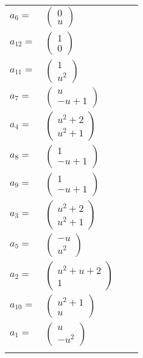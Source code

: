 \documentclass[1p]{elsarticle_modified}
\theoremstyle{definition}
\begin{document}
\begin{tabular}{m{7pt} m{180pt} m{7pt} m{180pt} }
\flushright $a_{6}=$&$\begin{pmatrix}0\\u\end{pmatrix}$ \\
\flushright $a_{12}=$&$\begin{pmatrix}1\\0\end{pmatrix}$ \\
\flushright $a_{11}=$&$\begin{pmatrix}1\\u^2\end{pmatrix}$ \\
\flushright $a_{7}=$&$\begin{pmatrix}u\\- u+1\end{pmatrix}$ \\
\flushright $a_{4}=$&$\begin{pmatrix}u^2+2\\u^2+1\end{pmatrix}$ \\
\flushright $a_{8}=$&$\begin{pmatrix}1\\- u+1\end{pmatrix}$ \\
\flushright $a_{9}=$&$\begin{pmatrix}1\\- u+1\end{pmatrix}$ \\
\flushright $a_{3}=$&$\begin{pmatrix}u^2+2\\u^2+1\end{pmatrix}$ \\
\flushright $a_{5}=$&$\begin{pmatrix}- u\\u^2\end{pmatrix}$ \\
\flushright $a_{2}=$&$\begin{pmatrix}u^2+u+2\\1\end{pmatrix}$ \\
\flushright $a_{10}=$&$\begin{pmatrix}u^2+1\\u\end{pmatrix}$ \\
\flushright $a_{1}=$&$\begin{pmatrix}u\\- u^2\end{pmatrix}$\\&\end{tabular}
\end{document}
